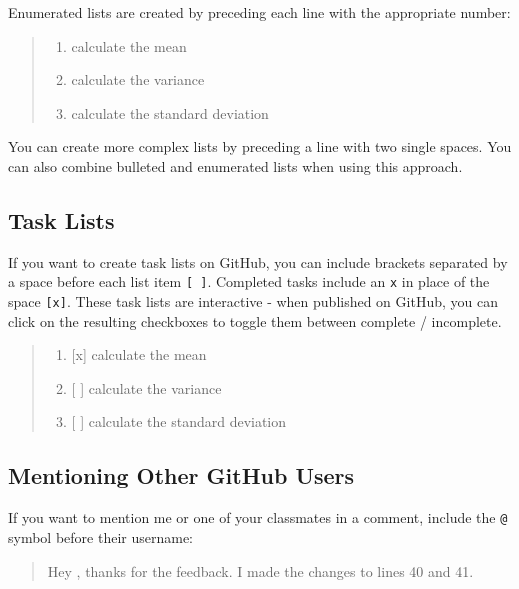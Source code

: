 \documentclass[]{book}
\providecommand{\tightlist}{%
  \setlength{\itemsep}{0pt}\setlength{\parskip}{0pt}}
\theoremstyle{definition}
\theoremstyle{definition}
\theoremstyle{remark}
\begin{document}
Enumerated lists are created by preceding each line with the appropriate
number:

\begin{quote}
\begin{enumerate}
\def\labelenumi{\arabic{enumi}.}
\tightlist
\item
  calculate the mean
\item
  calculate the variance
\item
  calculate the standard deviation
\end{enumerate}
\end{quote}

You can create more complex lists by preceding a line with two single
spaces. You can also combine bulleted and enumerated lists when using
this approach.

\subsection{Task Lists}\label{task-lists}

If you want to create task lists on GitHub, you can include brackets
separated by a space before each list item \texttt{{[}\ {]}}. Completed
tasks include an \texttt{x} in place of the space \texttt{{[}x{]}}.
These task lists are interactive - when published on GitHub, you can
click on the resulting checkboxes to toggle them between complete /
incomplete.

\begin{quote}
\begin{enumerate}
\def\labelenumi{\arabic{enumi}.}
\tightlist
\item
  {[}x{]} calculate the mean
\item
  {[} {]} calculate the variance
\item
  {[} {]} calculate the standard deviation
\end{enumerate}
\end{quote}

\subsection{Mentioning Other GitHub
Users}\label{mentioning-other-github-users}

If you want to mention me or one of your classmates in a comment,
include the \texttt{@} symbol before their username:

\begin{quote}
Hey \citet{chris-prener}, thanks for the feedback. I made the changes to
lines 40 and 41.
\end{quote}
\end{document}
